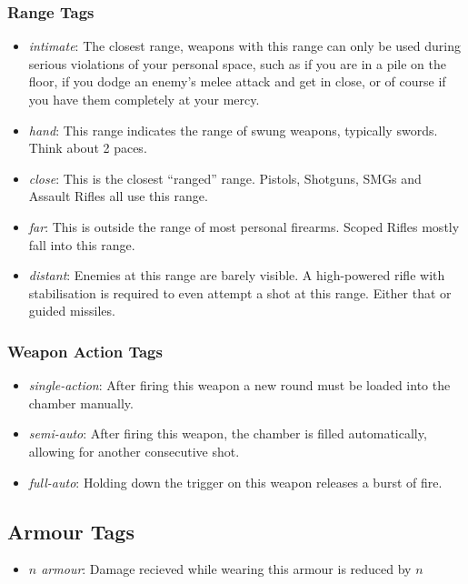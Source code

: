 \subsubsection{Range Tags}
\begin{itemize}
\item \textit{intimate}: The closest range, weapons with this range can only be used during serious violations of your personal space, such as if you are in a pile on the floor, if you dodge an enemy's melee attack and get in close, or of course if you have them completely at your mercy.
\item \textit{hand}: This range indicates the range of swung weapons, typically swords. Think about 2 paces.
\item \textit{close}: This is the closest ``ranged'' range. Pistols, Shotguns, SMGs and Assault Rifles all use this range.
\item \textit{far}: This is outside the range of most personal firearms. Scoped Rifles mostly fall into this range.
\item \textit{distant}: Enemies at this range are barely visible. A high-powered rifle with stabilisation is required to even attempt a shot at this range. Either that or guided missiles.
\end{itemize}

\subsubsection{Weapon Action Tags}
\begin{itemize}
\item \textit{single-action}: After firing this weapon a new round must be loaded into the chamber manually.
\item \textit{semi-auto}: After firing this weapon, the chamber is filled automatically, allowing for another consecutive shot.
\item \textit{full-auto}: Holding down the trigger on this weapon releases a burst of fire.
\end{itemize}

\subsection{Armour Tags}
\begin{itemize}
\item \textit{$n$ armour}: Damage recieved while wearing this armour is reduced by $n$
\end{itemize}